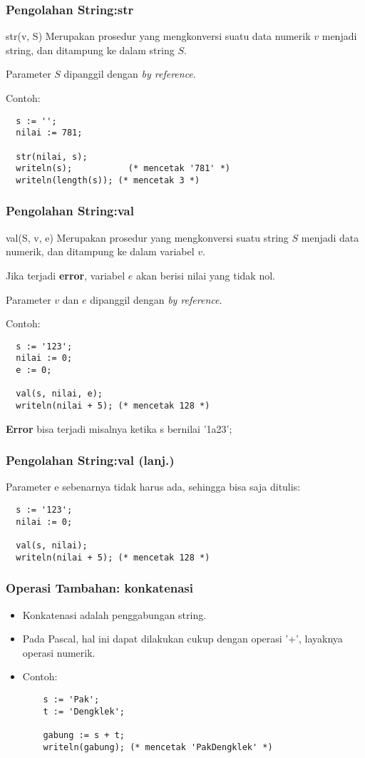 \begin{frame}[fragile]
\frametitle{Pengolahan String:\newline str}
\begin{block}{str(v, S)}
Merupakan prosedur yang mengkonversi suatu data numerik $v$ menjadi string, dan ditampung ke dalam string $S$.

Parameter $S$ dipanggil dengan \textit{by reference}.
\end{block}
Contoh:
\begin{lstlisting}
  s := '';
  nilai := 781;

  str(nilai, s);
  writeln(s);           (* mencetak '781' *)
  writeln(length(s)); (* mencetak 3 *)
\end{lstlisting}
\end{frame}

\begin{frame}[fragile]
\frametitle{Pengolahan String:\newline val}
\begin{block}{val(S, v, e)}
Merupakan prosedur yang mengkonversi suatu string $S$ menjadi data numerik, dan ditampung ke dalam variabel $v$.

Jika terjadi \textbf{error}, variabel $e$ akan berisi nilai yang tidak nol.

Parameter $v$ dan $e$ dipanggil dengan \textit{by reference}.
\end{block}
Contoh:
\begin{lstlisting}
  s := '123';
  nilai := 0;
  e := 0;

  val(s, nilai, e);
  writeln(nilai + 5); (* mencetak 128 *)
\end{lstlisting}

\textbf{Error} bisa terjadi misalnya ketika s bernilai '1a23';
\end{frame}

\begin{frame}[fragile]
\frametitle{Pengolahan String:\newline val (lanj.)}
Parameter e sebenarnya tidak harus ada, sehingga bisa saja ditulis:
\begin{lstlisting}
  s := '123';
  nilai := 0;

  val(s, nilai);
  writeln(nilai + 5); (* mencetak 128 *)
\end{lstlisting}
\end{frame}

\begin{frame}[fragile]
\frametitle{Operasi Tambahan: konkatenasi}
\begin{itemize}
  \item Konkatenasi adalah penggabungan string.
  \item Pada Pascal, hal ini dapat dilakukan cukup dengan operasi '+', layaknya operasi numerik.
  \item Contoh:
  \begin{lstlisting}
    s := 'Pak';
    t := 'Dengklek';

    gabung := s + t;
    writeln(gabung); (* mencetak 'PakDengklek' *)
  \end{lstlisting}
\end{itemize}
\end{frame}


